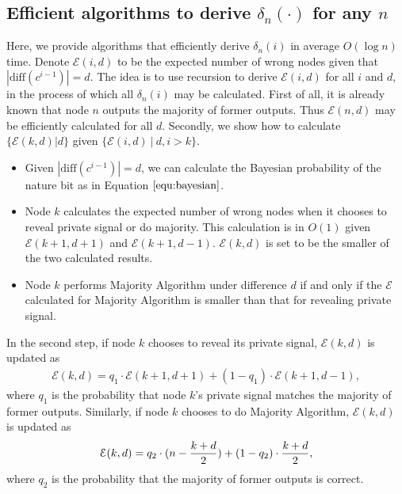 \documentclass[a4paper,UKenglish]{lipics}
\theoremstyle{definition}
\newcommand{\diff}{\text{diff}}
\begin{document}
\subsection{Efficient algorithms to derive $\delta_n(\cdot)$ for any $n$}
\label{subsec:algorithm}
Here, we provide algorithms that efficiently derive $\delta_n(i)$ in average $O(\log n)$ time. 
Denote $\mathcal{E}(i,d)$ to be the expected number of wrong nodes given that $|\diff(c^{i-1})| = d$. 
The idea is to use recursion to derive $\mathcal{E}(i,d)$ for all $i$ and $d$, in the process of which all $\delta_n(i)$ may be calculated.
First of all, it is already known that node $n$ outputs the majority of former outputs.
Thus $\mathcal{E}(n,d)$ may be efficiently calculated for all $d$.
Secondly, we show how to calculate $\{\mathcal{E}(k,d)|d\}$ given $\{\mathcal{E}(i,d)~|~d, i > k\}$.
\begin{itemize}
\item Given $|\diff(c^{i-1})| = d$, we can calculate the Bayesian probability of the nature bit as in Equation $\ref{equ:bayesian}$.
\item Node $k$ calculates the expected number of wrong nodes when it chooses to reveal private signal or do majority. 
	This calculation is in $O(1)$ given $\mathcal{E}(k+1,d+1)$ and $\mathcal{E}(k+1,d-1)$.
	$\mathcal{E}(k,d)$ is set to be the smaller of the two calculated results. 
\item Node $k$ performs Majority Algorithm under difference $d$ if and only if the $\mathcal{E}$ calculated for Majority Algorithm is smaller than that for revealing private signal.
\end{itemize}
In the second step, if node $k$ chooses to reveal its private signal, $\mathcal{E}(k, d)$ is updated as
\begin{equation} 
\label{equ:revealupdate}
\begin{aligned}
	\mathcal{E}(k,d) 
= 
 	q_1\cdot \mathcal{E}(k+1, d+1) + (1-q_1)\cdot \mathcal{E}(k+1, d-1),
\end{aligned}
\end{equation}
where $q_1$ is the probability that node $k$'s private signal matches the majority of former outputs.
Similarly, if node $k$ chooses to do Majority Algorithm, $\mathcal{E}(k, d)$ is updated as
\begin{equation}
\label{equ:majorityupdate}
	\mathcal{E}(k,d) 
= 
	q_2\cdot (n - {k+d\over 2}) + (1-q_2)\cdot {k+d\over 2},
\end{equation}
where $q_2$ is the probability that the majority of former outputs is correct.
\end{document}
